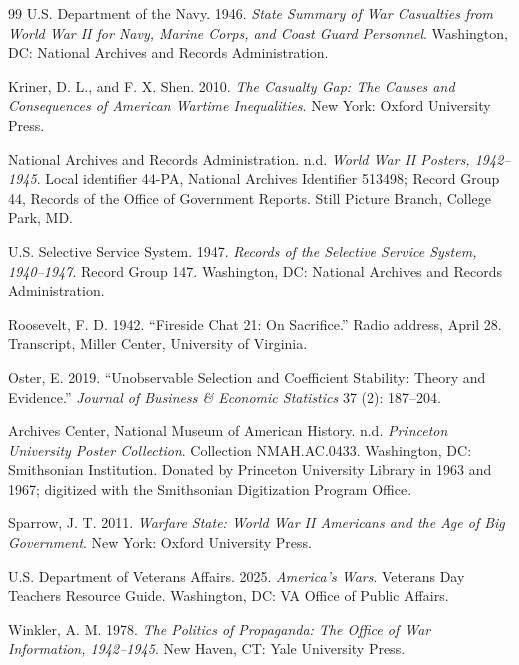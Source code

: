 \documentclass[12pt]{article}
\begin{document}
\begin{thebibliography}{99}
U.S. Department of the Navy. 1946. \emph{State Summary of War Casualties from World War II for Navy, Marine Corps, and Coast Guard Personnel}. Washington, DC: National Archives and Records Administration.

Kriner, D. L., and F. X. Shen. 2010. \emph{The Casualty Gap: The Causes and Consequences of American Wartime Inequalities}. New York: Oxford University Press.

National Archives and Records Administration. n.d. \emph{World War II Posters, 1942--1945}. Local identifier 44-PA, National Archives Identifier 513498; Record Group 44, Records of the Office of Government Reports. Still Picture Branch, College Park, MD.

U.S. Selective Service System. 1947. \emph{Records of the Selective Service System, 1940--1947}. Record Group 147. Washington, DC: National Archives and Records Administration.

Roosevelt, F. D. 1942. ``Fireside Chat 21: On Sacrifice.'' Radio address, April 28. Transcript, Miller Center, University of Virginia.

Oster, E. 2019. ``Unobservable Selection and Coefficient Stability: Theory and Evidence.'' \emph{Journal of Business \& Economic Statistics} 37 (2): 187--204.

Archives Center, National Museum of American History. n.d. \emph{Princeton University Poster Collection}. Collection NMAH.AC.0433. Washington, DC: Smithsonian Institution. Donated by Princeton University Library in 1963 and 1967; digitized with the Smithsonian Digitization Program Office.

Sparrow, J. T. 2011. \emph{Warfare State: World War II Americans and the Age of Big Government}. New York: Oxford University Press.

U.S. Department of Veterans Affairs. 2025. \emph{America's Wars}. Veterans Day Teachers Resource Guide. Washington, DC: VA Office of Public Affairs.

Winkler, A. M. 1978. \emph{The Politics of Propaganda: The Office of War Information, 1942--1945}. New Haven, CT: Yale University Press.

\end{thebibliography}
\end{document}

